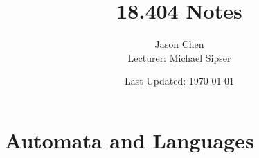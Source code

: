 \documentclass{chezreport}
\title{18.404 Notes}
\author{Jason Chen \\ Lecturer: Michael Sipser}
\date{Last Updated: \today}
\begin{document}
\maketitle
\setcounter{tocdepth}{2}
\tableofcontents

\chapter{Automata and Languages}





























%
\end{document}
